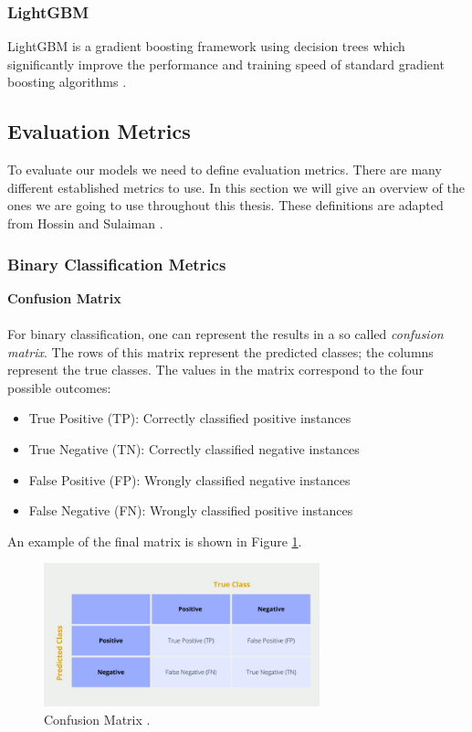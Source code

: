 \subsubsection{LightGBM}
LightGBM is a gradient boosting framework using decision trees which significantly improve the performance and training speed of standard gradient boosting algorithms \cite{lgbm}.

\subsection{Evaluation Metrics}
To evaluate our models we need to define evaluation metrics. There are many different established metrics to use. In this section we will give an overview of the ones we are going to use throughout this thesis. These definitions are adapted from Hossin and Sulaiman \cite{metrics}.

\subsubsection{Binary Classification Metrics}

\textbf{Confusion Matrix} \\ \\
For binary classification, one can represent the results in a so called \textit{confusion matrix}. The rows of this matrix represent the predicted classes; the columns represent the true classes. The values in the matrix correspond to the four possible outcomes:
\begin{itemize}
	\item[\textbullet] True Positive (TP): Correctly classified positive instances
	\item[\textbullet] True Negative (TN): Correctly classified negative instances
	\item[\textbullet] False Positive (FP): Wrongly classified negative instances
	\item[\textbullet] False Negative (FN): Wrongly classified positive instances
\end{itemize}
An example of the final matrix is shown in Figure \ref{fig:confusion-matrix}.
\begin{figure}[h]
  \centering
  \includegraphics[width=8cm]{fig/confusion_matrix.png}
  \caption{Confusion Matrix \cite{confusion}.}%
  \label{fig:confusion-matrix}
\end{figure}

